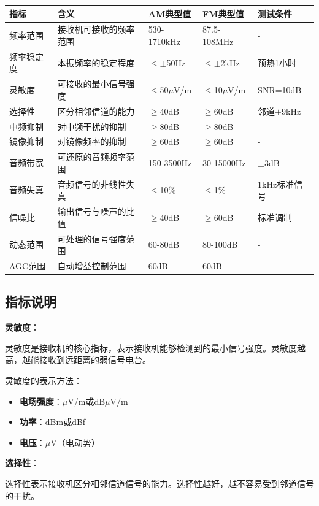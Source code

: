 \begin{center}
\begin{tabular}{|p{3cm}|p{3cm}|p{3cm}|p{4cm}|p{3cm}|}
\hline
\textbf{指标} & \textbf{含义} & \textbf{AM典型值} & \textbf{FM典型值} & \textbf{测试条件} \\
\hline
频率范围 & 接收机可接收的频率范围 & 530-1710kHz & 87.5-108MHz & - \\
频率稳定度 & 本振频率的稳定程度 & $\leq \pm$50Hz & $\leq \pm$2kHz & 预热1小时 \\
灵敏度 & 可接收的最小信号强度 & $\leq$50$\mu$V/m & $\leq$10$\mu$V/m & SNR=10dB \\
选择性 & 区分相邻信道的能力 & $\geq$40dB & $\geq$60dB & 邻道$\pm$9kHz \\
中频抑制 & 对中频干扰的抑制 & $\geq$80dB & $\geq$80dB & - \\
镜像抑制 & 对镜像频率的抑制 & $\geq$60dB & $\geq$60dB & - \\
音频带宽 & 可还原的音频频率范围 & 150-3500Hz & 30-15000Hz & $\pm$3dB \\
音频失真 & 音频信号的非线性失真 & $\leq$10\% & $\leq$1\% & 1kHz标准信号 \\
信噪比 & 输出信号与噪声的比值 & $\geq$40dB & $\geq$60dB & 标准调制 \\
动态范围 & 可处理的信号强度范围 & 60-80dB & 80-100dB & - \\
AGC范围 & 自动增益控制范围 & 60dB & 60dB & - \\
\hline
\end{tabular}
\end{center}

\subsection{指标说明}
\label{sec:receiver_specs_explain}

\textbf{灵敏度}：

灵敏度是接收机的核心指标，表示接收机能够检测到的最小信号强度。灵敏度越高，越能接收到远距离的弱信号电台。

灵敏度的表示方法：
\begin{itemize}
    \item \textbf{电场强度}：$\mu$V/m或dB$\mu$V/m
    \item \textbf{功率}：dBm或dBf
    \item \textbf{电压}：$\mu$V（电动势）
\end{itemize}

\textbf{选择性}：

选择性表示接收机区分相邻信道信号的能力。选择性越好，越不容易受到邻道信号的干扰。

